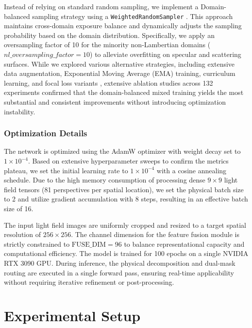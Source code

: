 \documentclass[lettersize,journal]{IEEEtran}
\begin{document}
Instead of relying on standard random sampling, we implement a Domain-balanced sampling strategy using a \texttt{WeightedRandomSampler} \cite{he2016deep}. This approach maintains cross-domain exposure balance and dynamically adjusts the sampling probability based on the domain distribution. Specifically, we apply an oversampling factor of 10 for the minority non-Lambertian domains ($nl\_oversampling\_factor = 10$) to alleviate overfitting on specular and scattering surfaces. While we explored various alternative strategies, including extensive data augmentation, Exponential Moving Average (EMA) training, curriculum learning, and focal loss variants \cite{lin2017focal}, extensive ablation studies across 132 experiments confirmed that the domain-balanced mixed training yields the most substantial and consistent improvements without introducing optimization instability.

\subsubsection{Optimization Details}
The network is optimized using the AdamW optimizer \cite{loshchilov2019adamw} with weight decay set to $1 \times 10^{-4}$. Based on extensive hyperparameter sweeps to confirm the metrics plateau, we set the initial learning rate to $1 \times 10^{-4}$ with a cosine annealing schedule. Due to the high memory consumption of processing dense $9 \times 9$ light field tensors (81 perspectives per spatial location), we set the physical batch size to 2 and utilize gradient accumulation with 8 steps, resulting in an effective batch size of 16. 

The input light field images are uniformly cropped and resized to a target spatial resolution of $256 \times 256$. The channel dimension for the feature fusion module is strictly constrained to $\text{FUSE\_DIM} = 96$ to balance representational capacity and computational efficiency. The model is trained for 100 epochs on a single NVIDIA RTX 3090 GPU. During inference, the physical decomposition and dual-mask routing are executed in a single forward pass, ensuring real-time applicability without requiring iterative refinement or post-processing.


\section{Experimental Setup}
\end{document}
